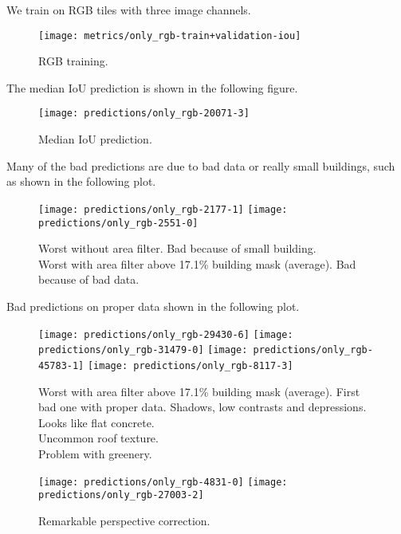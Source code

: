 We train on RGB tiles with three image channels.

\begin{figure}[H]
  \centering
  \texttt{[image: metrics/only\_rgb-train+validation-iou]}
  \caption{%
    RGB training.
  }%
  \label{fig:rgb-training}
\end{figure}

The median IoU prediction is shown in the following figure.

\begin{figure}[H]
  \centering
  \texttt{[image: predictions/only\_rgb-20071-3]}  %
  \caption{%
    Median IoU prediction.
  }%
  \label{rgb-median-prediction}
\end{figure}

Many of the bad predictions are due to bad data or really small buildings, such as shown in the following plot.

\begin{figure}[H]
  \centering
  \texttt{[image: predictions/only\_rgb-2177-1]}  %
  \texttt{[image: predictions/only\_rgb-2551-0]}  %
  \caption{%
    Worst without area filter. Bad because of small building. \\
    Worst with area filter above 17.1\% building mask (average).
    Bad because of bad data.
  }
  \label{fig:rgb-fundamental-issues}
\end{figure}

Bad predictions on proper data shown in the following plot.

\begin{figure}[H]
  \centering
  \texttt{[image: predictions/only\_rgb-29430-6]}  %
  \texttt{[image: predictions/only\_rgb-31479-0]}  %
  \texttt{[image: predictions/only\_rgb-45783-1]}  %
  \texttt{[image: predictions/only\_rgb-8117-3]}  %
  \caption{%
    Worst with area filter above 17.1\% building mask (average).  First bad one with proper data.  Shadows, low contrasts and depressions. \\
    Looks like flat concrete. \\
    Uncommon roof texture. \\
    Problem with greenery.
  }%
  \label{fig:rgb-prediction-issues}
\end{figure}

\begin{figure}[H]
  \centering
  \texttt{[image: predictions/only\_rgb-4831-0]}  %
  \texttt{[image: predictions/only\_rgb-27003-2]}  %
  \caption{%
    Remarkable perspective correction. \\
  }%
  \label{fig:perspective-correction}
\end{figure}
